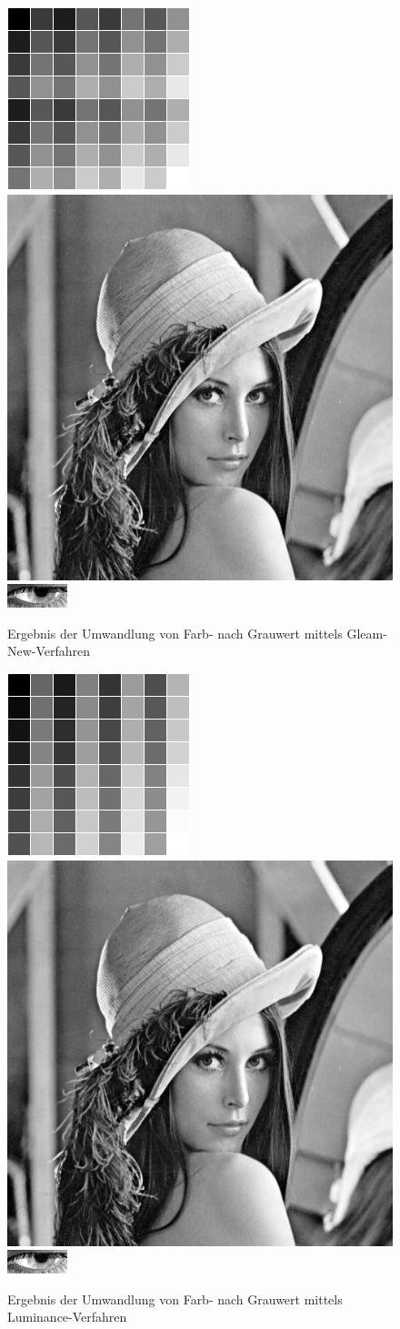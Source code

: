 \begin{figure}[p]
	\centering
	\includegraphics[width=0.2\linewidth]{img/Farbkarte1}
	\includegraphics[width=0.2\linewidth]{img/Lena1}
	\includegraphics[width=0.2\linewidth]{img/Auge_1Gray}
	\caption{Ergebnis der Umwandlung von Farb- nach Grauwert mittels Gleam-New-Verfahren}
	\label{img_NewGeam}
\end{figure}
\begin{figure}[p]
	\centering
	\includegraphics[width=0.2\linewidth]{img/Farbkarte0}
	\includegraphics[width=0.2\linewidth]{img/Lena0}
	\includegraphics[width=0.2\linewidth]{img/Auge_0Gray}
	\caption{Ergebnis der Umwandlung von Farb- nach Grauwert mittels Luminance-Verfahren}
	\label{img_Luminance}
\end{figure}
